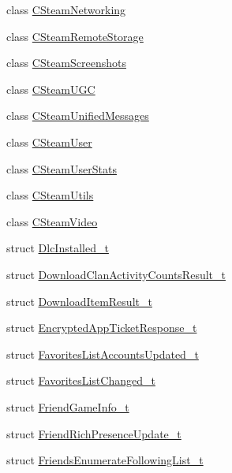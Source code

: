 \begin{DoxyCompactItemize}
\item 
class \hyperlink{classValve_1_1Steamworks_1_1CSteamNetworking}{C\+Steam\+Networking}
\item 
class \hyperlink{classValve_1_1Steamworks_1_1CSteamRemoteStorage}{C\+Steam\+Remote\+Storage}
\item 
class \hyperlink{classValve_1_1Steamworks_1_1CSteamScreenshots}{C\+Steam\+Screenshots}
\item 
class \hyperlink{classValve_1_1Steamworks_1_1CSteamUGC}{C\+Steam\+U\+G\+C}
\item 
class \hyperlink{classValve_1_1Steamworks_1_1CSteamUnifiedMessages}{C\+Steam\+Unified\+Messages}
\item 
class \hyperlink{classValve_1_1Steamworks_1_1CSteamUser}{C\+Steam\+User}
\item 
class \hyperlink{classValve_1_1Steamworks_1_1CSteamUserStats}{C\+Steam\+User\+Stats}
\item 
class \hyperlink{classValve_1_1Steamworks_1_1CSteamUtils}{C\+Steam\+Utils}
\item 
class \hyperlink{classValve_1_1Steamworks_1_1CSteamVideo}{C\+Steam\+Video}
\item 
struct \hyperlink{structValve_1_1Steamworks_1_1DlcInstalled__t}{Dlc\+Installed\+\_\+t}
\item 
struct \hyperlink{structValve_1_1Steamworks_1_1DownloadClanActivityCountsResult__t}{Download\+Clan\+Activity\+Counts\+Result\+\_\+t}
\item 
struct \hyperlink{structValve_1_1Steamworks_1_1DownloadItemResult__t}{Download\+Item\+Result\+\_\+t}
\item 
struct \hyperlink{structValve_1_1Steamworks_1_1EncryptedAppTicketResponse__t}{Encrypted\+App\+Ticket\+Response\+\_\+t}
\item 
struct \hyperlink{structValve_1_1Steamworks_1_1FavoritesListAccountsUpdated__t}{Favorites\+List\+Accounts\+Updated\+\_\+t}
\item 
struct \hyperlink{structValve_1_1Steamworks_1_1FavoritesListChanged__t}{Favorites\+List\+Changed\+\_\+t}
\item 
struct \hyperlink{structValve_1_1Steamworks_1_1FriendGameInfo__t}{Friend\+Game\+Info\+\_\+t}
\item 
struct \hyperlink{structValve_1_1Steamworks_1_1FriendRichPresenceUpdate__t}{Friend\+Rich\+Presence\+Update\+\_\+t}
\item 
struct \hyperlink{structValve_1_1Steamworks_1_1FriendsEnumerateFollowingList__t}{Friends\+Enumerate\+Following\+List\+\_\+t}
\item 

\end{DoxyCompactItemize}
